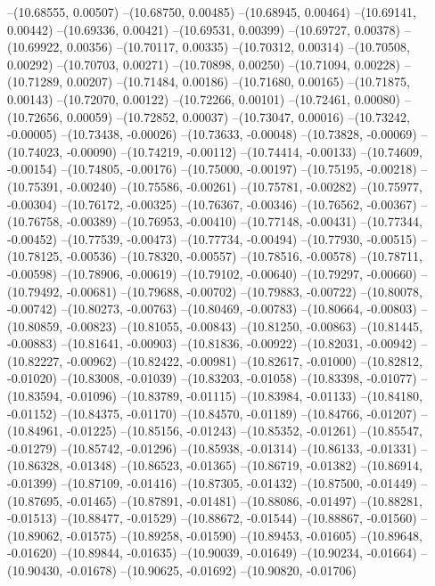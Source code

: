 --(10.68555, 0.00507)
--(10.68750, 0.00485)
--(10.68945, 0.00464)
--(10.69141, 0.00442)
--(10.69336, 0.00421)
--(10.69531, 0.00399)
--(10.69727, 0.00378)
--(10.69922, 0.00356)
--(10.70117, 0.00335)
--(10.70312, 0.00314)
--(10.70508, 0.00292)
--(10.70703, 0.00271)
--(10.70898, 0.00250)
--(10.71094, 0.00228)
--(10.71289, 0.00207)
--(10.71484, 0.00186)
--(10.71680, 0.00165)
--(10.71875, 0.00143)
--(10.72070, 0.00122)
--(10.72266, 0.00101)
--(10.72461, 0.00080)
--(10.72656, 0.00059)
--(10.72852, 0.00037)
--(10.73047, 0.00016)
--(10.73242, -0.00005)
--(10.73438, -0.00026)
--(10.73633, -0.00048)
--(10.73828, -0.00069)
--(10.74023, -0.00090)
--(10.74219, -0.00112)
--(10.74414, -0.00133)
--(10.74609, -0.00154)
--(10.74805, -0.00176)
--(10.75000, -0.00197)
--(10.75195, -0.00218)
--(10.75391, -0.00240)
--(10.75586, -0.00261)
--(10.75781, -0.00282)
--(10.75977, -0.00304)
--(10.76172, -0.00325)
--(10.76367, -0.00346)
--(10.76562, -0.00367)
--(10.76758, -0.00389)
--(10.76953, -0.00410)
--(10.77148, -0.00431)
--(10.77344, -0.00452)
--(10.77539, -0.00473)
--(10.77734, -0.00494)
--(10.77930, -0.00515)
--(10.78125, -0.00536)
--(10.78320, -0.00557)
--(10.78516, -0.00578)
--(10.78711, -0.00598)
--(10.78906, -0.00619)
--(10.79102, -0.00640)
--(10.79297, -0.00660)
--(10.79492, -0.00681)
--(10.79688, -0.00702)
--(10.79883, -0.00722)
--(10.80078, -0.00742)
--(10.80273, -0.00763)
--(10.80469, -0.00783)
--(10.80664, -0.00803)
--(10.80859, -0.00823)
--(10.81055, -0.00843)
--(10.81250, -0.00863)
--(10.81445, -0.00883)
--(10.81641, -0.00903)
--(10.81836, -0.00922)
--(10.82031, -0.00942)
--(10.82227, -0.00962)
--(10.82422, -0.00981)
--(10.82617, -0.01000)
--(10.82812, -0.01020)
--(10.83008, -0.01039)
--(10.83203, -0.01058)
--(10.83398, -0.01077)
--(10.83594, -0.01096)
--(10.83789, -0.01115)
--(10.83984, -0.01133)
--(10.84180, -0.01152)
--(10.84375, -0.01170)
--(10.84570, -0.01189)
--(10.84766, -0.01207)
--(10.84961, -0.01225)
--(10.85156, -0.01243)
--(10.85352, -0.01261)
--(10.85547, -0.01279)
--(10.85742, -0.01296)
--(10.85938, -0.01314)
--(10.86133, -0.01331)
--(10.86328, -0.01348)
--(10.86523, -0.01365)
--(10.86719, -0.01382)
--(10.86914, -0.01399)
--(10.87109, -0.01416)
--(10.87305, -0.01432)
--(10.87500, -0.01449)
--(10.87695, -0.01465)
--(10.87891, -0.01481)
--(10.88086, -0.01497)
--(10.88281, -0.01513)
--(10.88477, -0.01529)
--(10.88672, -0.01544)
--(10.88867, -0.01560)
--(10.89062, -0.01575)
--(10.89258, -0.01590)
--(10.89453, -0.01605)
--(10.89648, -0.01620)
--(10.89844, -0.01635)
--(10.90039, -0.01649)
--(10.90234, -0.01664)
--(10.90430, -0.01678)
--(10.90625, -0.01692)
--(10.90820, -0.01706)
